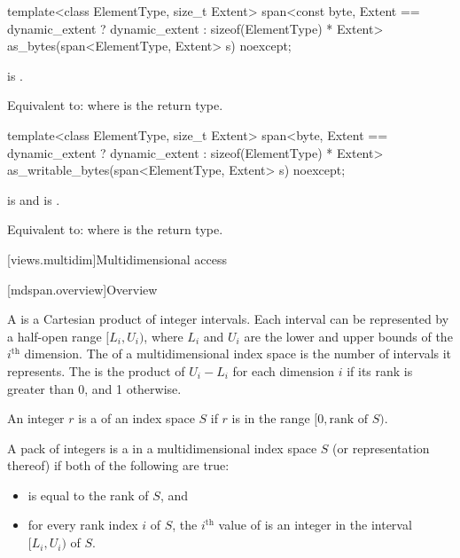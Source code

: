 %
\begin{itemdecl}
template<class ElementType, size_t Extent>
  span<const byte, Extent == dynamic_extent ? dynamic_extent : sizeof(ElementType) * Extent>
    as_bytes(span<ElementType, Extent> s) noexcept;
\end{itemdecl}

\begin{itemdescr}
\pnum
\constraints
{} is .

\pnum
\effects
Equivalent to: 
where  is the return type.
\end{itemdescr}

%
\begin{itemdecl}
template<class ElementType, size_t Extent>
  span<byte, Extent == dynamic_extent ? dynamic_extent : sizeof(ElementType) * Extent>
    as_writable_bytes(span<ElementType, Extent> s) noexcept;
\end{itemdecl}

\begin{itemdescr}
\pnum
\constraints
{} is  and
 is .

\pnum
\effects
Equivalent to: 
where  is the return type.
\end{itemdescr}

[views.multidim]{Multidimensional access}

[mdspan.overview]{Overview}

\pnum
A  is
a Cartesian product of integer intervals.
Each interval can be represented by a half-open range $[L_i, U_i)$,
where $L_i$ and $U_i$ are the lower and upper bounds of
the $i^\text{th}$ dimension.
The  of a multidimensional index space is
the number of intervals it represents.
The  is
the product of $U_i - L_i$ for each dimension $i$
if its rank is greater than 0, and 1 otherwise.

\pnum
An integer $r$ is a  of an index space $S$
if $r$ is in the range $[0, \text{rank of $S$})$.

\pnum
A pack of integers  is
a  in a multidimensional index space $S$
(or representation thereof) if both of the following are true:
\begin{itemize}
\item
{} is equal to the rank of $S$, and
\item
for every rank index $i$ of $S$,
the $i^\text{th}$ value of  is an integer
in the interval $[L_i, U_i)$ of $S$.
\end{itemize}

